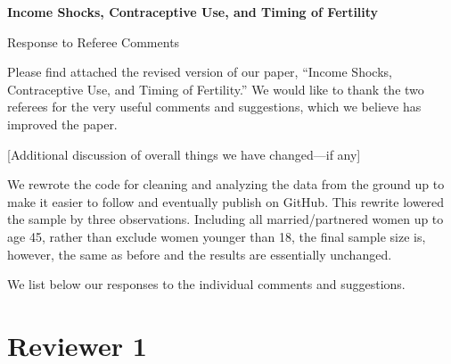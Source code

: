 \documentclass[letterpaper,12pt]{article}
\title{} \author{}
\begin{document}
\begin{center} \textbf{\large Income Shocks, Contraceptive Use, and
Timing of Fertility} \end{center}

\begin{center} Response to Referee Comments \end{center}

\noindent Please find attached the revised version of our paper,
``Income Shocks, Contraceptive Use, and Timing of Fertility.''
We would like to thank the two referees for the very useful comments and
suggestions,
which we believe has improved the paper.

[Additional discussion of overall things we have changed---if any]

We rewrote the code for cleaning and analyzing the data from the ground up 
to make it easier to follow and eventually publish on GitHub.
This rewrite lowered the sample by three observations.
Including all married/partnered women up to age 45, rather than exclude
women younger than 18, the final sample size is, however, the same as 
before and the results are essentially unchanged.

We list below our responses to the individual comments and suggestions.


\newpage

\section*{Reviewer 1}

\end{document}
